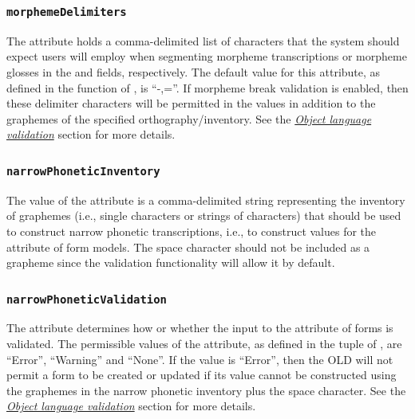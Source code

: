 \documentclass[letterpaper,10pt,english]{sphinxmanual}
\begin{document}
\subsubsection{\texttt{morphemeDelimiters}}
\label{datastructure:morphemedelimiters}
The  attribute holds a comma-delimited list of characters
that the system should expect users will employ when segmenting morpheme
transcriptions or morpheme glosses in the  and
 fields, respectively.  The default value for this attribute,
as defined in the  function of
, is ``-,=''.  If morpheme break validation is enabled, then these
delimiter characters will be permitted in the  values in
addition to the graphemes of the specified orthography/inventory.  See the
{\hyperref[interface:object-language-validation]{\emph{Object language validation}}} section for more details.


\subsubsection{\texttt{narrowPhoneticInventory}}
\label{datastructure:narrowphoneticinventory}
The value of the  attribute is a comma-delimited
string representing the inventory of graphemes (i.e., single characters or
strings of characters) that should be used to construct narrow phonetic
transcriptions, i.e., to construct values for the
 attribute of form models.  The space character
should not be included as a grapheme since the validation functionality will
allow it by default.


\subsubsection{\texttt{narrowPhoneticValidation}}
\label{datastructure:narrowphoneticvalidation}
The  attribute determines how or whether the input
to the  attribute of forms is validated.  The
permissible values of the  attribute, as defined in
the  tuple of , are ``Error'', ``Warning'' and
``None''.  If the value is ``Error'', then the OLD will not permit a form to be
created or updated if its  value cannot be
constructed using the graphemes in the narrow phonetic inventory plus the space
character.  See the {\hyperref[interface:object-language-validation]{\emph{Object language validation}}} section for more details.
\end{document}

